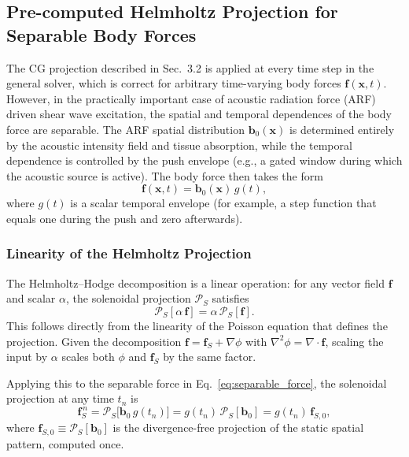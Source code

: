 \documentclass[11pt]{article}
\begin{document}
\subsection{Pre-computed Helmholtz Projection for Separable Body Forces}
\label{sec:precomputed_projection}

The CG projection described in Sec.~3.2 is applied at every time step in the
general solver, which is correct for arbitrary time-varying body forces
$\bm{f}(\bm{x},t)$. However, in the practically important case of acoustic
radiation force (ARF) driven shear wave excitation, the spatial and temporal
dependences of the body force are separable. The ARF spatial distribution
$\bm{b}_0(\bm{x})$ is determined entirely by the acoustic intensity field and
tissue absorption, while the temporal dependence is controlled by the push
envelope (e.g., a gated window during which the acoustic source is active). The
body force then takes the form
\begin{equation}
\bm{f}(\bm{x},t) = \bm{b}_0(\bm{x})\,g(t),
\label{eq:separable_force}
\end{equation}
where $g(t)$ is a scalar temporal envelope (for example, a step function that
equals one during the push and zero afterwards).

\subsubsection{Linearity of the Helmholtz Projection}

The Helmholtz--Hodge decomposition is a linear operation: for any vector field
$\bm{f}$ and scalar $\alpha$, the solenoidal projection $\mathcal{P}_S$
satisfies
\begin{equation}
\mathcal{P}_S[\alpha\,\bm{f}] = \alpha\,\mathcal{P}_S[\bm{f}].
\end{equation}
This follows directly from the linearity of the Poisson equation that defines
the projection. Given the decomposition $\bm{f} = \bm{f}_S + \nabla\phi$ with
$\nabla^2\phi = \nabla\cdot\bm{f}$, scaling the input by $\alpha$ scales both
$\phi$ and $\bm{f}_S$ by the same factor.

Applying this to the separable force in Eq.~\eqref{eq:separable_force}, the
solenoidal projection at any time $t_n$ is
\begin{equation}
\bm{f}_S^{\,n}
= \mathcal{P}_S\!\bigl[\bm{b}_0\,g(t_n)\bigr]
= g(t_n)\,\mathcal{P}_S[\bm{b}_0]
= g(t_n)\,\bm{f}_{S,0},
\label{eq:projected_separable}
\end{equation}
where $\bm{f}_{S,0} \equiv \mathcal{P}_S[\bm{b}_0]$ is the divergence-free
projection of the static spatial pattern, computed once.
\end{document}
